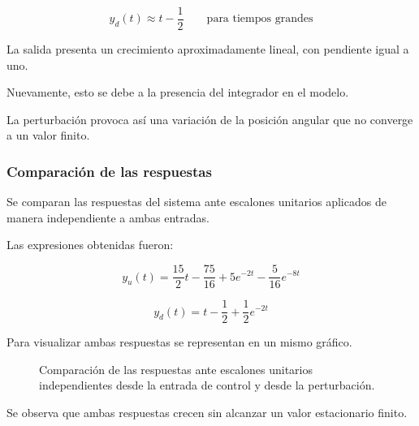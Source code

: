 \documentclass[12pt,a4paper]{article}
\begin{document}
\begin{equation}\boxed{y_d(t)\approx t-\frac12 \qquad \text{para tiempos grandes}}\end{equation}

La salida presenta un crecimiento aproximadamente lineal, con pendiente igual a uno.

Nuevamente, esto se debe a la presencia del integrador en el modelo.

La perturbación provoca así una variación de la posición angular que no converge a un valor finito.
\subsubsection*{Comparación de las respuestas}
Se comparan las respuestas del sistema ante escalones unitarios aplicados de manera independiente a ambas entradas.

Las expresiones obtenidas fueron:

\begin{equation}\boxed{y_u(t)=\frac{15}{2}t-\frac{75}{16}+5e^{-2t}-\frac{5}{16}e^{-8t}}\end{equation}

\begin{equation}\boxed{y_d(t)=t-\frac12+\frac12e^{-2t}}\end{equation}

Para visualizar ambas respuestas se representan en un mismo gráfico.

\begin{figure}[H]\centering{}\caption{Comparación de las respuestas ante escalones unitarios independientes desde la entrada de control y desde la perturbación.}\end{figure}
Se observa que ambas respuestas crecen sin alcanzar un valor estacionario finito.
\end{document}
